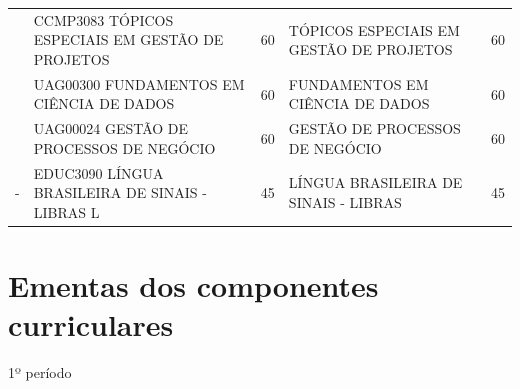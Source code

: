 \documentclass[
	12pt,				%
	openright,			%
  oneside,     %
	a4paper,			%
 hyphens,
	chapter=TITLE,		%
	english,			%
	french,				%
	spanish,			%
	brazil				%
	]{abntex2}
\begin{document}
\begin{center}
\begin{tiny}
\begin{longtable}{p{2cm}p{5.4cm}cp{5.4cm}c}
      & CCMP3083 TÓPICOS ESPECIAIS EM GESTÃO DE PROJETOS & 60 & TÓPICOS ESPECIAIS EM GESTÃO DE PROJETOS & 60 \\ \cline{2-5}
      & UAG00300 FUNDAMENTOS EM CIÊNCIA DE DADOS & 60 & FUNDAMENTOS EM CIÊNCIA DE DADOS & 60 \\ \cline{2-5}
      & UAG00024 GESTÃO DE PROCESSOS DE NEGÓCIO & 60 & GESTÃO DE PROCESSOS DE NEGÓCIO & 60 \\ \midrule
    - & EDUC3090 LÍNGUA BRASILEIRA DE SINAIS - LIBRAS L & 45 & LÍNGUA BRASILEIRA DE SINAIS - LIBRAS & 45 \\ 
  \bottomrule
  \end{longtable}
  \end{tiny}
  \end{center}
  






%
%


\chapter{Ementas dos componentes curriculares}


\vspace*{9.5cm}

\begin{center}
    {\huge 1º período}
\end{center}

\newpage






\end{document}
